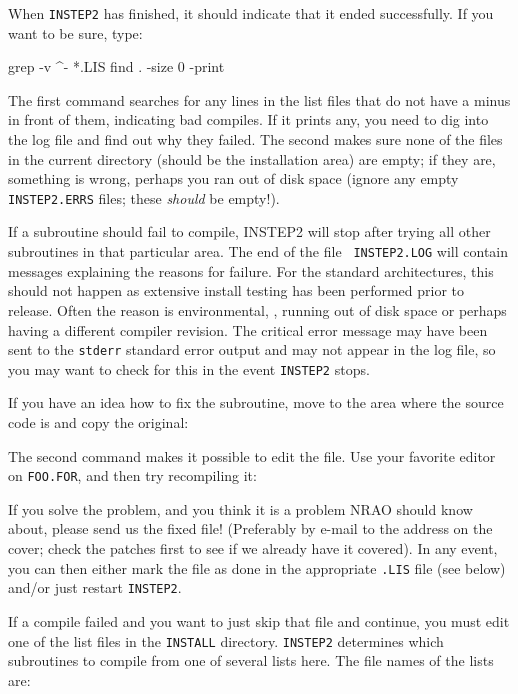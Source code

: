 When {\tt INSTEP2} has finished, it should indicate that it ended
successfully.  If you want to be sure, type:\medskip

\fortran
grep -v ^- *.LIS
find . -size 0 -print
\endfortran
\medskip

\noindent The first command searches for any lines in the list files
that do not have a minus in front of them, indicating bad compiles.  If
it prints any, you need to dig into the log file and find out why they
failed.  The second makes sure none of the files in the current
directory (should be the installation area) are empty; if they
are, something is wrong, perhaps you ran out of disk space (ignore any
empty {\tt INSTEP2.ERRS} files; these {\it should\/} be empty!).

\medskip{}

If a subroutine should fail to compile, INSTEP2 will stop after trying
all other subroutines in that particular area.  The end of the file {\tt
INSTEP2.LOG} will contain messages explaining the reasons for failure.
For the standard architectures, this should not happen as extensive
install testing has been performed prior to release.  Often the reason
is environmental, \eg, running out of disk space or perhaps having a
different compiler revision.  The critical error message may have been
sent to the {\tt stderr} standard error output and may not appear in the
log file, so you may want to check for this in the event {\tt INSTEP2}
stops.

If you have an idea how to fix the subroutine, move to the area where
the source code is and copy the original:\medskip

\medskip

\noindent The second command makes it possible to edit the file.  Use
your favorite editor on {\tt FOO.FOR}, and then try recompiling
it:\medskip

\medskip

\noindent If you solve the problem, and you think it is a problem NRAO
should know about, please send us the fixed file!  (Preferably by e-mail
to the address on the cover; check the patches first to see if we
already have it covered).  In any event, you can then either mark the
file as done in the appropriate {\tt .LIS} file (see below) and/or just
restart {\tt INSTEP2}.

If a compile failed and you want to just skip that file and continue,
you must edit one of the list files in the {\tt INSTALL} directory.
{\tt INSTEP2} determines which subroutines to compile from one of
several lists here.  The file names of the lists are:\medskip

